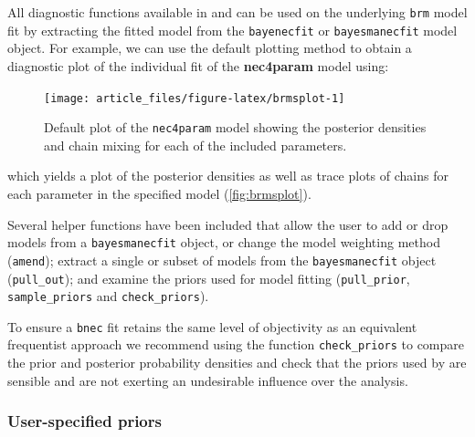 \documentclass[
  shortnames]{jss}
\begin{document}
All diagnostic functions available in  and  can be used on the underlying \texttt{brm} model fit by extracting the fitted  model from the \texttt{bayenecfit} or \texttt{bayesmanecfit} model object. For example, we can use the default  plotting method to obtain a diagnostic plot of the individual fit of the \textbf{nec4param} model using:

\begin{CodeChunk}
\begin{figure}[!ht]

{\centering \texttt{[image: article\_files/figure-latex/brmsplot-1]} 

}

\caption[Default  plot of the \texttt{nec4param} model showing the posterior densities and chain mixing for each of the included parameters]{Default  plot of the \texttt{nec4param} model showing the posterior densities and chain mixing for each of the included parameters.}\label{fig:brmsplot}
\end{figure}
\end{CodeChunk}

which yields a plot of the posterior densities as well as trace plots of chains for each parameter in the specified model (\autoref{fig:brmsplot}).

Several helper functions have been included that allow the user to add or drop models from a \texttt{bayesmanecfit} object, or change the model weighting method (\texttt{amend}); extract a single or subset of models from the \texttt{bayesmanecfit} object (\texttt{pull\_out}); and examine the priors used for model fitting (\texttt{pull\_prior}, \texttt{sample\_priors} and \texttt{check\_priors}).

To ensure a \texttt{bnec} fit retains the same level of objectivity as an equivalent frequentist approach we recommend using the function \texttt{check\_priors} to compare the prior and posterior probability densities and check that the priors used by  are sensible and are not exerting an undesirable influence over the analysis.

\hypertarget{user-specified-priors}{%
\subsubsection{User-specified priors}\label{user-specified-priors}}
\end{document}
